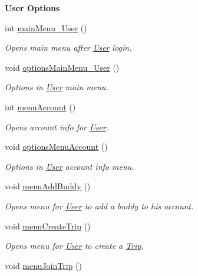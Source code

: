 \begin{Indent}\textbf{ User Options}\par
\begin{DoxyCompactItemize}
\item 
int \hyperlink{group___agency_gaef1bbd6021ec5639b2503d8bd8ec4244}{main\+Menu\+\_\+\+User} ()
\begin{DoxyCompactList}\small\item\em Opens main menu after \hyperlink{class_user}{User} login. \end{DoxyCompactList}\item 
void \hyperlink{group___agency_ga2199b59e94702baecd1589a7bf03ebcb}{options\+Main\+Menu\+\_\+\+User} ()
\begin{DoxyCompactList}\small\item\em Options in \hyperlink{class_user}{User} main menu. \end{DoxyCompactList}\item 
int \hyperlink{group___agency_ga108fc523a3e0545820e63741982e9327}{menu\+Account} ()
\begin{DoxyCompactList}\small\item\em Opens account info for \hyperlink{class_user}{User}. \end{DoxyCompactList}\item 
void \hyperlink{group___agency_ga580e845616f281e993d39e6a87b9725e}{options\+Menu\+Account} ()
\begin{DoxyCompactList}\small\item\em Options in \hyperlink{class_user}{User} account info menu. \end{DoxyCompactList}\item 
void \hyperlink{group___agency_gabbb862b2f97a318773851b4ebeb3de8a}{menu\+Add\+Buddy} ()
\begin{DoxyCompactList}\small\item\em Opens menu for \hyperlink{class_user}{User} to add a buddy to his account. \end{DoxyCompactList}\item 
void \hyperlink{group___agency_ga07c72d02ed02eac58a0624feb7fccea8}{menu\+Create\+Trip} ()
\begin{DoxyCompactList}\small\item\em Opens menu for \hyperlink{class_user}{User} to create a \hyperlink{class_trip}{Trip}. \end{DoxyCompactList}\item 
void \hyperlink{group___agency_gab83663afe4fceea7def561cbf3a85c84}{menu\+Join\+Trip} ()

\end{DoxyCompactItemize}
\end{Indent}
